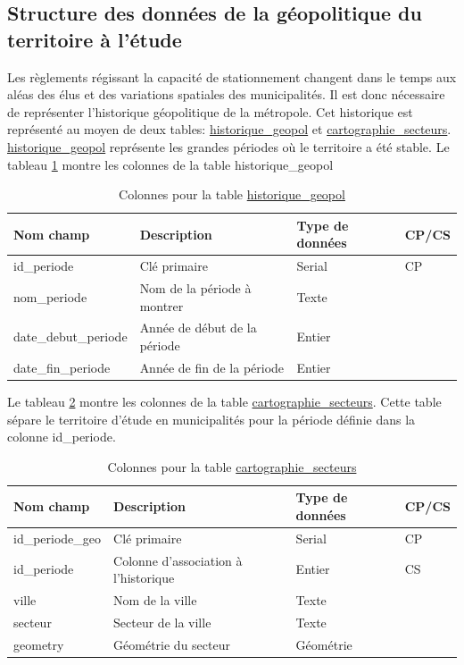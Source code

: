     \subsection{Structure des données de la géopolitique du territoire à l'étude} 
    Les règlements régissant la capacité de stationnement changent dans le temps aux aléas des élus et des variations spatiales des municipalités. Il est donc nécessaire de représenter l'historique géopolitique de la métropole. Cet historique est représenté au moyen de deux tables: \underline{historique\_geopol} et \underline{cartographie\_secteurs}. \underline{historique\_geopol} représente les grandes périodes où le territoire a été stable. 
    Le tableau \ref{tab:definition_historique_geopol} montre les colonnes de la table {historique\_geopol} \par
    \begin{table}[h]
       \centering
       \begin{tabular}{m{}|m{}m{}m{}}
            \hline
            Nom champ & Description & Type de données & CP/CS  \\
            \hline
            id\_periode & Clé primaire  & Serial & CP \\ 
            nom\_periode & Nom de la période à montrer & Texte & \\ 
            date\_debut\_periode & Année de début de la période & Entier & \\ 
            date\_fin\_periode & Année de fin de la période& Entier & \\ 
            \hline
       \end{tabular}
       \caption{Colonnes pour la table \underline{historique\_geopol}}
       \label{tab:definition_historique_geopol}
   \end{table}\FloatBarrier
   Le tableau \ref{tab:definition_cartographie_secteurs} montre les colonnes de la table \underline{cartographie\_secteurs}. Cette table sépare le territoire d'étude en municipalités pour la période définie dans la colonne id\_periode.\par
    \begin{table}[h]
       \centering
       \begin{tabular}{m{}|m{}m{}m{}}
            \hline
            Nom champ & Description & Type de données & CP/CS  \\
            \hline
            id\_periode\_geo & Clé primaire  & Serial & CP \\ 
            id\_periode & Colonne d'association à l'historique & Entier & CS\\ 
            ville & Nom de la ville & Texte & \\ 
            secteur & Secteur de la ville & Texte & \\ 
            geometry & Géométrie du secteur & Géométrie & \\
            \hline
       \end{tabular}
       \caption{Colonnes pour la table \underline{cartographie\_secteurs}}
       \label{tab:definition_cartographie_secteurs}
    \end{table}

